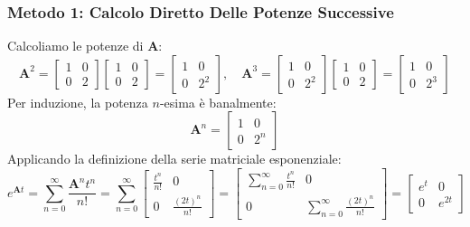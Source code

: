 \documentclass[11pt, a4paper]{article}
\begin{document}
\subsubsection{Metodo 1: Calcolo Diretto Delle Potenze Successive}
Calcoliamo le potenze di $\bm{A}$:
\[
    \bm{A}^2 = \begin{bmatrix} 1 & 0 \\ 0 & 2 \end{bmatrix} \begin{bmatrix} 1 & 0 \\ 0 & 2 \end{bmatrix} = \begin{bmatrix} 1 & 0 \\ 0 & 2^2 \end{bmatrix}, \quad
    \bm{A}^3 = \begin{bmatrix} 1 & 0 \\ 0 & 2^2 \end{bmatrix} \begin{bmatrix} 1 & 0 \\ 0 & 2 \end{bmatrix} = \begin{bmatrix} 1 & 0 \\ 0 & 2^3 \end{bmatrix}
\]
Per induzione, la potenza $n$-esima è banalmente:
\[
    \bm{A}^n = \begin{bmatrix} 1 & 0 \\ 0 & 2^n \end{bmatrix}
\]
Applicando la definizione della serie matriciale esponenziale:
\[
    e^{\bm{A}t} = \sum_{n=0}^{\infty} \frac{\bm{A}^n t^n}{n!} = \sum_{n=0}^{\infty} \begin{bmatrix} \frac{t^n}{n!} & 0 \\ 0 & \frac{(2t)^n}{n!} \end{bmatrix} = \begin{bmatrix} \sum_{n=0}^{\infty} \frac{t^n}{n!} & 0 \\ 0 & \sum_{n=0}^{\infty} \frac{(2t)^n}{n!} \end{bmatrix} = \begin{bmatrix} e^t & 0 \\ 0 & e^{2t} \end{bmatrix}
\]
\end{document}
